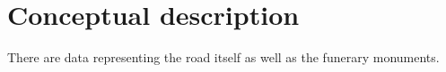 \section{Conceptual description}
\label{sec:concept_descr}

There are data representing the road itself as well as the funerary monuments.